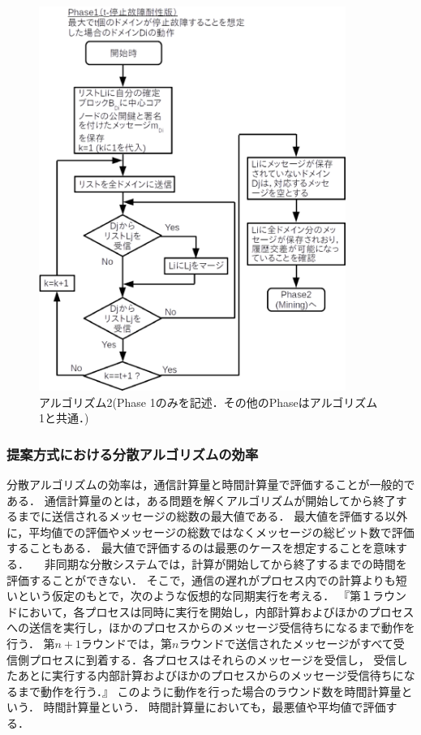\documentclass[a4paper,12pt]{jsarticle}
\begin{document}
\begin{figure}[H]%
  \begin{center}
    \includegraphics[width=100mm]{pht/flow_chart-algorithm2.eps}
  \end{center}
  \caption{アルゴリズム2(Phase 1のみを記述．その他のPhaseはアルゴリズム1と共通．)}
  \label{fig:algorithm2}
\end{figure}
%
      \subsubsection{提案方式における分散アルゴリズムの効率}%
分散アルゴリズムの効率は，通信計算量と時間計算量で評価することが一般的である．
通信計算量のとは，ある問題を解くアルゴリズムが開始してから終了するまでに送信されるメッセージの総数の最大値である．
最大値を評価する以外に，平均値での評価やメッセージの総数ではなくメッセージの総ビット数で評価することもある．
最大値で評価するのは最悪のケースを想定することを意味する．
　非同期な分散システムでは，計算が開始してから終了するまでの時間を評価することができない．
そこで，通信の遅れがプロセス内での計算よりも短いという仮定のもとで，次のような仮想的な同期実行を考える．
『第１ラウンドにおいて，各プロセスは同時に実行を開始し，内部計算およびほかのプロセスへの送信を実行し，ほかのプロセスからのメッセージ受信待ちになるまで動作を行う．
第$n + 1$ラウンドでは，第$n$ラウンドで送信されたメッセージがすべて受信側プロセスに到着する．各プロセスはそれらのメッセージを受信し，
受信したあとに実行する内部計算およびほかのプロセスからのメッセージ受信待ちになるまで動作を行う．』
このように動作を行った場合のラウンド数を時間計算量という．
時間計算量という．
時間計算量においても，最悪値や平均値で評価する．
\end{document}
